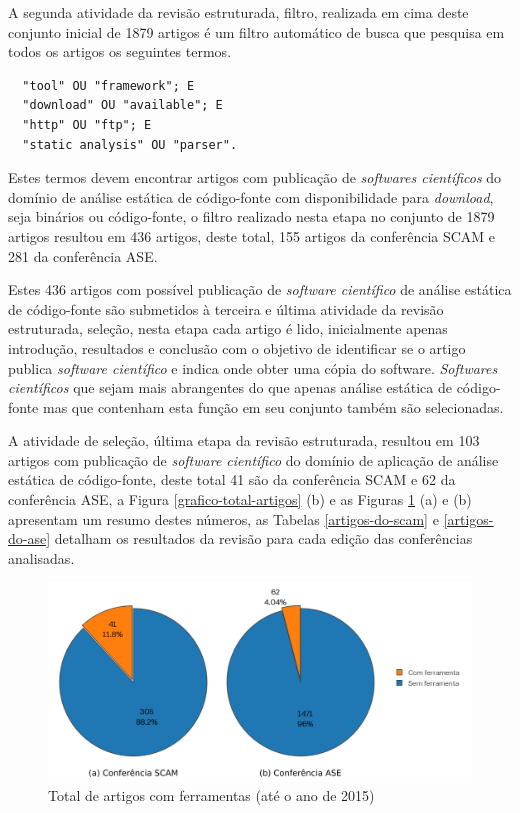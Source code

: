 A segunda atividade da revisão estruturada, filtro, realizada em cima deste conjunto
inicial de 1879 artigos é um filtro automático de busca que pesquisa em todos
os artigos os seguintes termos.

\begin{verbatim}
  "tool" OU "framework"; E
  "download" OU "available"; E
  "http" OU "ftp"; E
  "static analysis" OU "parser".
\end{verbatim}

Estes termos devem encontrar artigos com publicação de {\it softwares
científicos} do domínio de análise estática de código-fonte com disponibilidade
para {\it download}, seja binários ou código-fonte, o filtro realizado nesta
etapa no conjunto de 1879 artigos resultou em 436 artigos, deste total,
155 artigos da conferência SCAM e 281 da conferência ASE.

Estes 436 artigos com possível publicação de {\it software científico} de
análise estática de código-fonte são submetidos à terceira e última atividade
da revisão estruturada, seleção, nesta etapa cada artigo é lido, inicialmente
apenas introdução, resultados e conclusão com o objetivo de identificar se o
artigo publica {\it software científico} e indica onde obter uma cópia do
software. {\it Softwares científicos} que sejam mais abrangentes do que apenas
análise estática de código-fonte mas que contenham esta função em seu conjunto
também são selecionadas.

A atividade de seleção, última etapa da revisão estruturada, resultou em 103
artigos com publicação de {\it software científico} do domínio de aplicação de
análise estática de código-fonte, deste total 41 são da conferência
SCAM e 62 da conferência ASE, a Figura \ref{grafico-total-artigos} (b) e as
Figuras \ref{ferramentas-por-conferencia} (a) e (b) apresentam um resumo destes
números, as Tabelas \ref{artigos-do-scam} e \ref{artigos-do-ase} detalham os
resultados da revisão para cada edição das conferências analisadas.

\begin{figure}[h]
  \center
  \includegraphics[scale=1]{imagens/ferramentas-por-conferencia.png}
  \caption{Total de artigos com ferramentas (até o ano de 2015)}
  \label{ferramentas-por-conferencia}
\end{figure}

